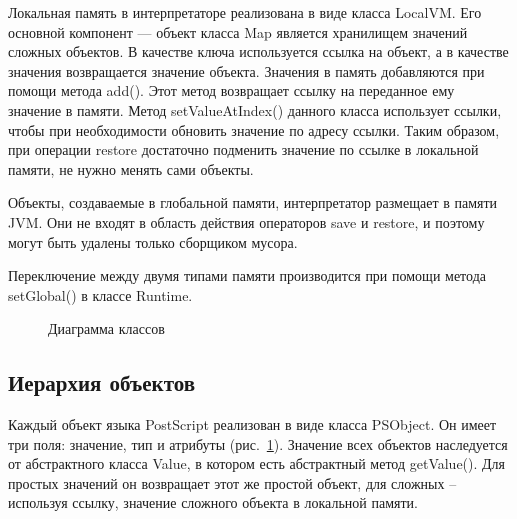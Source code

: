 Локальная память в интерпретаторе реализована в виде класса LocalVM. Его основной компонент --- объект класса Map является хранилищем значений сложных объектов. В качестве ключа используется ссылка на объект, а в качестве значения возвращается значение объекта. Значения в память добавляются при помощи метода add(). Этот метод возвращает ссылку на переданное ему значение в памяти. Метод setValueAtIndex() данного класса использует ссылки, чтобы при необходимости обновить значение по адресу ссылки. Таким образом, при операции restore достаточно подменить значение по ссылке в локальной памяти, не нужно менять сами объекты.

Объекты, создаваемые в глобальной памяти, интерпретатор размещает в памяти JVM. Они не входят в область действия операторов save и restore, и поэтому могут быть удалены только сборщиком мусора.

Переключение между двумя типами памяти производится при помощи метода setGlobal() в классе Runtime.

\begin{figure}[t]
\caption{Диаграмма классов}\label{pic_Frame}
\end{figure}

\subsection{Иерархия объектов}

Каждый объект языка PostScript реализован в виде класса PSObject. Он имеет три поля: значение, тип и атрибуты (рис.~\ref{pic_Frame}). Значение всех объектов наследуется от абстрактного класса Value, в котором есть абстрактный метод getValue(). Для простых значений он возвращает этот же простой объект, для сложных -- используя ссылку, значение сложного объекта в локальной памяти. 

